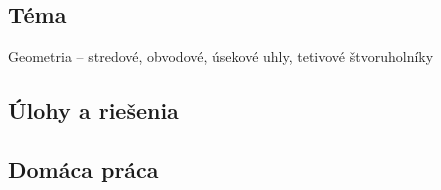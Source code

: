 
\subsection*{Téma}
Geometria -- stredové, obvodové, úsekové uhly, tetivové štvoruholníky


\subsection*{Úlohy a riešenia}














\subsection*{Domáca práca}


